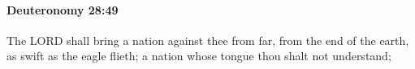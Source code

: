 
		\paragraph{Deuteronomy 28:49} %
			\label{DEUTERONOMY-28-49}

			The LORD shall bring a nation against thee from far, from the end of the earth, as swift as the eagle flieth; a nation whose tongue thou shalt not understand;


